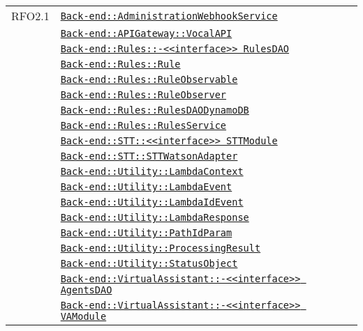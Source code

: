 \begin{longtable}{|>{\centering}m{3cm}|m{10cm}<{\centering}|}
RFO2.1 & \hyperref[Back-end::AdministrationWebhookService]{\texttt{Back-end::AdministrationWebhookService}}\\
& \hyperref[Back-end::APIGateway::VocalAPI]{\texttt{Back-end::APIGateway::VocalAPI}}\\
& \hyperref[Back-end::Rules::<<interface>> RulesDAO]{\texttt{Back-end::Rules::-\linebreak <<interface>> RulesDAO}}\\
& \hyperref[Back-end::Rules::Rule]{\texttt{Back-end::Rules::Rule}}\\
& \hyperref[Back-end::Rules::RuleObservable]{\texttt{Back-end::Rules::RuleObservable}}\\
& \hyperref[Back-end::Rules::RuleObserver]{\texttt{Back-end::Rules::RuleObserver}}\\
& \hyperref[Back-end::Rules::RulesDAODynamoDB]{\texttt{Back-end::Rules::RulesDAODynamoDB}}\\
& \hyperref[Back-end::Rules::RulesService]{\texttt{Back-end::Rules::RulesService}}\\
& \hyperref[Back-end::STT::<<interface>> STTModule]{\texttt{Back-end::STT::<<interface>> STTModule}}\\
& \hyperref[Back-end::STT::STTWatsonAdapter]{\texttt{Back-end::STT::STTWatsonAdapter}}\\
& \hyperref[Back-end::Utility::LambdaContext]{\texttt{Back-end::Utility::LambdaContext}}\\
& \hyperref[Back-end::Utility::LambdaEvent]{\texttt{Back-end::Utility::LambdaEvent}}\\
& \hyperref[Back-end::Utility::LambdaIdEvent]{\texttt{Back-end::Utility::LambdaIdEvent}}\\
& \hyperref[Back-end::Utility::LambdaResponse]{\texttt{Back-end::Utility::LambdaResponse}}\\
& \hyperref[Back-end::Utility::PathIdParam]{\texttt{Back-end::Utility::PathIdParam}}\\
& \hyperref[Back-end::Utility::ProcessingResult]{\texttt{Back-end::Utility::ProcessingResult}}\\
& \hyperref[Back-end::Utility::StatusObject]{\texttt{Back-end::Utility::StatusObject}}\\
& \hyperref[Back-end::VirtualAssistant::<<interface>> AgentsDAO]{\texttt{Back-end::VirtualAssistant::-\linebreak <<interface>> AgentsDAO}}\\
& \hyperref[Back-end::VirtualAssistant::<<interface>> VAModule]{\texttt{Back-end::VirtualAssistant::-\linebreak <<interface>> VAModule}}\\

\end{longtable}
